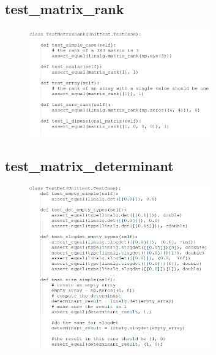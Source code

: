 \documentclass[a4paper,11pt]{article}
\begin{document}
\subsection{test\_matrix\_rank}	
\begin{figure}[h]
	\centering
	\includegraphics[width=0.70\textwidth]{snippets/rank/1.png}
\end{figure}

\subsection{test\_matrix\_determinant}	
\begin{figure}[h]
	\centering
	\includegraphics[width=0.70\textwidth]{snippets/Det/1.png}
\end{figure}
\end{document}
